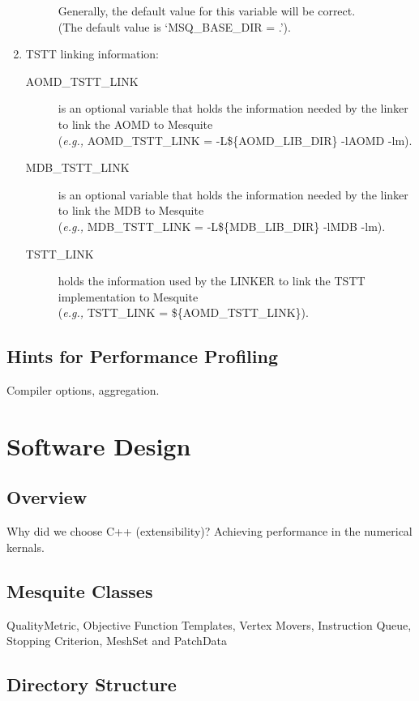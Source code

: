 \begin{enumerate}
\begin{description}
	Generally, the default value for this variable will be correct.\\
	(The default value is `MSQ\_BASE\_DIR = .').
  \end{description}
\item TSTT linking information:
\begin{description}
  \item[AOMD\_TSTT\_LINK] is an optional variable that holds the
	information needed by the linker to link the AOMD to Mesquite\\
	({\it e.g.,} AOMD\_TSTT\_LINK = -L\$\{AOMD\_LIB\_DIR\} -lAOMD -lm).
  \item[MDB\_TSTT\_LINK] is an optional variable that holds the
	information needed by the linker to link the MDB to Mesquite\\
	({\it e.g.,} MDB\_TSTT\_LINK = -L\$\{MDB\_LIB\_DIR\} -lMDB -lm).
  \item[TSTT\_LINK] holds the information used by the LINKER to link
	the TSTT implementation to Mesquite \\
	({\it e.g.,} TSTT\_LINK = \$\{AOMD\_TSTT\_LINK\}).
\end{description}
\end{enumerate}


\subsection{Hints for Performance Profiling}
Compiler options, aggregation.

\section{Software Design}

\subsection{Overview}
Why did we choose C++ (extensibility)? Achieving performance in the 
numerical kernals.

\subsection{Mesquite Classes}
QualityMetric, Objective Function Templates, Vertex Movers, Instruction Queue,
Stopping Criterion, MeshSet and PatchData

\subsection{Directory Structure}

